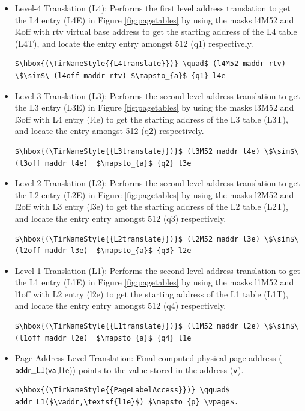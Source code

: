 \begin{itemize}
  \item Level-4 Translation (L4): Performs the first level address translation to get the L4 entry (L4E) in Figure \ref{fig:pagetables} by using the masks l4M52 and l4off with \textsf{rtv} virtual base address to get the starting address of the L4 table (L4T), and locate the entry entry amongst 512 (q1) respectively.
    \begin{lstlisting}[language=Coq]
      $\hbox{(\TirNameStyle{{L4translate}})} \quad$ (l4M52 maddr rtv) \$\sim$\ (l4off maddr rtv) $\mapsto_{a}$ {q1} l4e 
    \end{lstlisting}
 \item Level-3 Translation (L3): Performs the second level address translation to get the L3 entry (L3E) in Figure \ref{fig:pagetables} by using the masks l3M52 and l3off with L4 entry (l4e) to get the starting address of the L3 table (L3T), and locate the entry amongst 512 (q2) respectively.
    \begin{lstlisting}[language=Coq]
    $\hbox{(\TirNameStyle{{L3translate}})}$ (l3M52 maddr l4e) \$\sim$\ (l3off maddr l4e)  $\mapsto_{a}$ {q2} l3e
    \end{lstlisting}
  \item Level-2 Translation (L2): Performs the second level address translation to get the L2 entry (L2E) in Figure \ref{fig:pagetables} by using the masks l2M52 and l2off with L3 entry (l3e) to get the starting address of the L2 table (L2T), and locate the entry entry amongst 512 (q3) respectively.
\begin{lstlisting}[language=Coq]
    $\hbox{(\TirNameStyle{{L2translate}})}$ (l2M52 maddr l3e) \$\sim$\ (l2off maddr l3e)  $\mapsto_{a}$ {q3} l2e
    \end{lstlisting}
  \item Level-1 Translation (L1): Performs the second level address translation to get the L1 entry (L1E) in Figure \ref{fig:pagetables} by using the masks l1M52 and l1off with L2 entry (l2e) to get the starting address of the L1 table (L1T), and locate the entry entry amongst 512 (q4) respectively.
   \begin{lstlisting}[language=Coq]
    $\hbox{(\TirNameStyle{{L1translate}})}$ (l1M52 maddr l2e) \$\sim$\ (l1off maddr l2e)  $\mapsto_{a}$ {q4} l1e
    \end{lstlisting}
  \item Page Address Level Translation: Final computed physical page-address ($\textsf{addr\_L1}(\mathsf{va}$,$\textsf{l1e}$)) points-to the value stored in the address ($\textsf{v}$).
   \begin{lstlisting}[language=Coq]
    $\hbox{(\TirNameStyle{{PageLabelAccess}})} \qquad$ addr_L1($\vaddr,\textsf{l1e}$) $\mapsto_{p} \vpage$.
    \end{lstlisting} 
\end{itemize}
